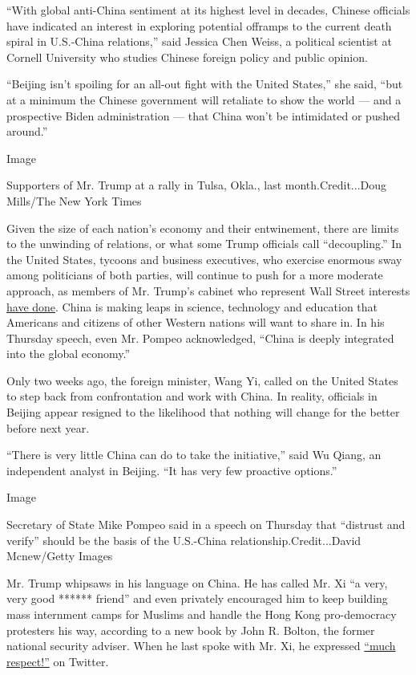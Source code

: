 ``With global anti-China sentiment at its highest level in decades,
Chinese officials have indicated an interest in exploring potential
offramps to the current death spiral in U.S.-China relations,'' said
Jessica Chen Weiss, a political scientist at Cornell University who
studies Chinese foreign policy and public opinion.

``Beijing isn't spoiling for an all-out fight with the United States,''
she said, ``but at a minimum the Chinese government will retaliate to
show the world --- and a prospective Biden administration --- that China
won't be intimidated or pushed around.''

Image

Supporters of Mr. Trump at a rally in Tulsa, Okla., last
month.Credit...Doug Mills/The New York Times

Given the size of each nation's economy and their entwinement, there are
limits to the unwinding of relations, or what some Trump officials call
``decoupling.'' In the United States, tycoons and business executives,
who exercise enormous sway among politicians of both parties, will
continue to push for a more moderate approach, as members of Mr. Trump's
cabinet who represent Wall Street interests
\href{https://www.nytimes3xbfgragh.onion/2020/04/02/us/politics/coronavirus-trump-china.html}{have
done}. China is making leaps in science, technology and education that
Americans and citizens of other Western nations will want to share in.
In his Thursday speech, even Mr. Pompeo acknowledged, ``China is deeply
integrated into the global economy.''

Only two weeks ago, the foreign minister, Wang Yi, called on the United
States to step back from confrontation and work with China. In reality,
officials in Beijing appear resigned to the likelihood that nothing will
change for the better before next year.

``There is very little China can do to take the initiative,'' said Wu
Qiang, an independent analyst in Beijing. ``It has very few proactive
options.''

Image

Secretary of State Mike Pompeo said in a speech on Thursday that
``distrust and verify'' should be the basis of the U.S.-China
relationship.Credit...David Mcnew/Getty Images

Mr. Trump whipsaws in his language on China. He has called Mr. Xi ``a
very, very good ****** friend'' and even privately encouraged him to
keep building mass internment camps for Muslims and handle the Hong Kong
pro-democracy protesters his way, according to a new book by John R.
Bolton, the former national security adviser. When he last spoke with
Mr. Xi, he expressed
\href{https://twitter.com/realdonaldtrump/status/1243407157321560071?lang=en}{``much
respect!''} on Twitter.

